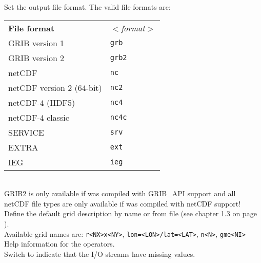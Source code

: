 \begin{tabbing}
         \> Set the output file format. The valid file formats are: \\
         \> \parbox[r]{3in}{
              \vspace*{1mm}
              \hspace*{0cm}\begin{tabular}{|l|l|}
              \hline
              \rowcolor{pcolor2}
              {\bf File format}          & \sl $<$format$>$ \\
               GRIB version 1            & {\tt grb}  \\
               GRIB version 2            & {\tt grb2} \\
               netCDF                    & {\tt nc}   \\
               netCDF version 2 (64-bit) & {\tt nc2}  \\
               netCDF-4 (HDF5)           & {\tt nc4}  \\
               netCDF-4 classic          & {\tt nc4c} \\
               SERVICE                   & {\tt srv}  \\
               EXTRA                     & {\tt ext}  \\
               IEG                       & {\tt ieg}  \\
              \hline
              \end{tabular}
              \vspace*{1mm}
            } \\
         \> GRIB2 is only available if {\CDO} was compiled with GRIB\_API support and all \\
         \> netCDF file types are only available if {\CDO} was compiled with netCDF support! \\
         \> Define the default grid description by name or from file (see chapter 1.3 on page \pageref{GRID_DESCRIPTION}). \\
         \> Available grid names are: {\tt r<NX>x<NY>}, {\tt lon=<LON>/lat=<LAT>}, {\tt n<N>}, {\tt gme<NI>} \\
         \> Help information for the operators. \\
         \> Switch to indicate that the I/O streams have missing values. \\

\end{tabbing}
